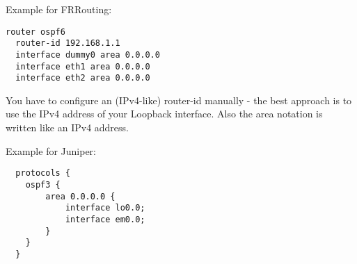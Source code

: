 Example for FRRouting:
\begin{verbatim}
router ospf6
  router-id 192.168.1.1
  interface dummy0 area 0.0.0.0
  interface eth1 area 0.0.0.0
  interface eth2 area 0.0.0.0
\end{verbatim}
You have to configure an (IPv4-like) router-id manually - the best approach is to use the IPv4 address of your Loopback interface. Also the area notation is written like an IPv4 address.

Example for Juniper:
\begin{verbatim}
  protocols {
    ospf3 {
        area 0.0.0.0 {
            interface lo0.0;
            interface em0.0;
        }
    }
  }
\end{verbatim}

\iffalse %

\section{Experiment 1a, 1b and 1c: Setup IGP}
Please see separate experiment documentation.

\section{Experiment \theexperiment}
\subsection{Network Setup}
Network is a ring-shaped network out of all participants' routers (see
picture \ref{fig:exp1}).

\begin{figure}
  \texttt{[image: img/i-wt-BGP-Raspi-Experiment01-iBGP-01.png]}
  \caption{Experiment 1 - Setting up an IGP}
  \label{fig:exp1}
\end{figure}

\subsection{Task}
To complete this experiment, you must:
\begin{itemize}
  \item Configure your assigned loopback IP address on your router
  \item Configure \gls{OSPF} on your router so it talks to its neighbors
  \item Redistribute your loopback address via OSPF. Use
  \begin{verbatim}
    redistribute connected subnets
  \end{verbatim}
  for this.
  \item See the other routers loopback addresses in your routing table.
\end{itemize}

\fi %
